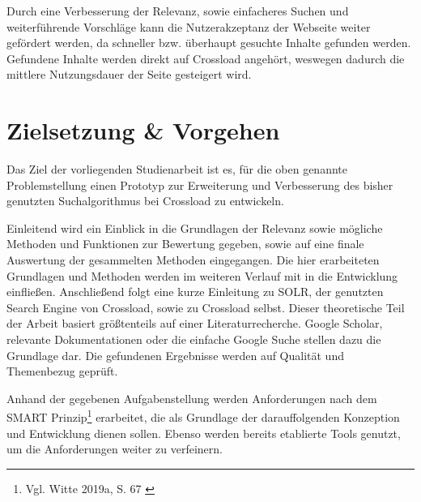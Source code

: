 Durch eine Verbesserung der Relevanz, sowie einfacheres Suchen und weiterführende Vorschläge kann die Nutzerakzeptanz der Webseite weiter gefördert werden, da schneller bzw. überhaupt gesuchte Inhalte gefunden werden.
Gefundene Inhalte werden direkt auf Crossload angehört, weswegen dadurch die mittlere Nutzungsdauer der Seite gesteigert wird.

\section{Zielsetzung \& Vorgehen}
Das Ziel der vorliegenden Studienarbeit ist es, für die oben genannte Problemstellung einen Prototyp zur Erweiterung und Verbesserung des bisher genutzten Suchalgorithmus bei Crossload zu entwickeln.

Einleitend wird ein Einblick in die Grundlagen der Relevanz sowie mögliche Methoden und Funktionen zur Bewertung gegeben, sowie auf eine finale Auswertung der gesammelten Methoden eingegangen.
Die hier erarbeiteten Grundlagen und Methoden werden im weiteren Verlauf mit in die Entwicklung einfließen.
Anschließend folgt eine kurze Einleitung zu SOLR, der genutzten Search Engine von Crossload, sowie zu Crossload selbst.
Dieser theoretische Teil der Arbeit basiert größtenteils auf einer Literaturrecherche.
Google Scholar, relevante Dokumentationen oder die einfache Google Suche stellen dazu die Grundlage dar.
Die gefundenen Ergebnisse werden auf Qualität und Themenbezug geprüft.

Anhand der gegebenen Aufgabenstellung werden Anforderungen nach dem SMART Prinzip\footnote{Vgl. Witte 2019a, S. 67 \cite{witte2016}} erarbeitet, die als Grundlage der darauffolgenden Konzeption und Entwicklung dienen sollen.
Ebenso werden bereits etablierte Tools genutzt, um die Anforderungen weiter zu verfeinern.

